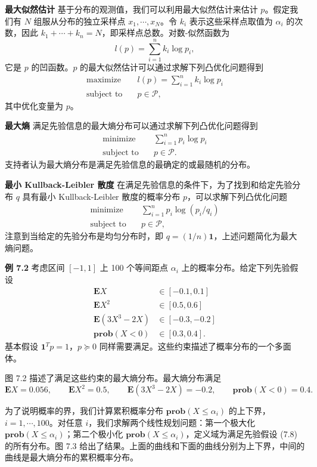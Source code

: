 \documentclass[UTF8,12pt,a4paper,fontset=fandol]{ctexart}
\begin{document}
\noindent\textbf{最大似然估计}\quad
基于分布的观测值，我们可以利用最大似然估计来估计 $p$。假定我们有 $N$ 组服从分布的独立采样点 $x_1,\cdots,x_N$。令 $k_i$ 表示这些采样点取值为 $\alpha_i$ 的次数，因此 $k_1+\cdots+k_n=N$，即采样点总数。对数-似然函数为
\[
l(p)=\sum_{i=1}^n k_i\log p_i,
\]
它是 $p$ 的凹函数。$p$ 的最大似然估计可以通过求解下列凸优化问题得到
\[
\begin{aligned}
\text{maximize}\quad & l(p)=\sum_{i=1}^n k_i\log p_i\\
\text{subject to}\quad & p\in\mathcal{P},
\end{aligned}
\]
其中优化变量为 $p$。

\noindent\textbf{最大熵}\quad
满足先验信息的最大熵分布可以通过求解下列凸优化问题得到
\[
\begin{aligned}
\text{minimize}\quad & \sum_{i=1}^n p_i\log p_i\\
\text{subject to}\quad & p\in\mathcal{P}.
\end{aligned}
\]
支持者认为最大熵分布是满足先验信息的最确定的或最随机的分布。

\noindent\textbf{最小 Kullback-Leibler 散度}\quad
在满足先验信息的条件下，为了找到和给定先验分布 $q$ 具有最小 Kullback-Leibler 散度的概率分布 $p$，可以求解下列凸优化问题
\[
\begin{aligned}
\text{minimize}\quad & \sum_{i=1}^n p_i\log(p_i/q_i)\\
\text{subject to}\quad & p\in\mathcal{P},
\end{aligned}
\]
注意到当给定的先验分布是均匀分布时，即 $q=(1/n)\mathbf{1}$，上述问题简化为最大熵问题。

\noindent\textbf{例 7.2}\quad
考虑区间 $[-1,1]$ 上 100 个等间距点 $\alpha_i$ 上的概率分布。给定下列先验假设
\begin{equation}
\begin{aligned}
\mathbf{E}X&\in[-0.1,0.1]\\
\mathbf{E}X^2&\in[0.5,0.6]\\
\mathbf{E}(3X^3-2X)&\in[-0.3,-0.2]\\
\mathbf{prob}(X<0)&\in[0.3,0.4].
\end{aligned}
\tag{7.8}
\end{equation}
基本假设 $\mathbf{1}^Tp=1$，$p\succeq 0$ 同样需要满足。这些约束描述了概率分布的一个多面体。

图 7.2 描述了满足这些约束的最大熵分布。最大熵分布满足
\[
\mathbf{E}X=0.056,\qquad
\mathbf{E}X^2=0.5,\qquad
\mathbf{E}(3X^3-2X)=-0.2,\qquad
\mathbf{prob}(X<0)=0.4.
\]

为了说明概率的界，我们计算累积概率分布 $\mathbf{prob}(X\leq \alpha_i)$ 的上下界，$i=1,\cdots,100$。对任意 $i$，我们求解两个线性规划问题：第一个极大化 $\mathbf{prob}(X\leq \alpha_i)$；第二个极小化 $\mathbf{prob}(X\leq \alpha_i)$，定义域为满足先验假设 (7.8) 的所有分布。图 7.3 给出了结果。上面的曲线和下面的曲线分别为上下界，中间的曲线是最大熵分布的累积概率分布。
\end{document}
